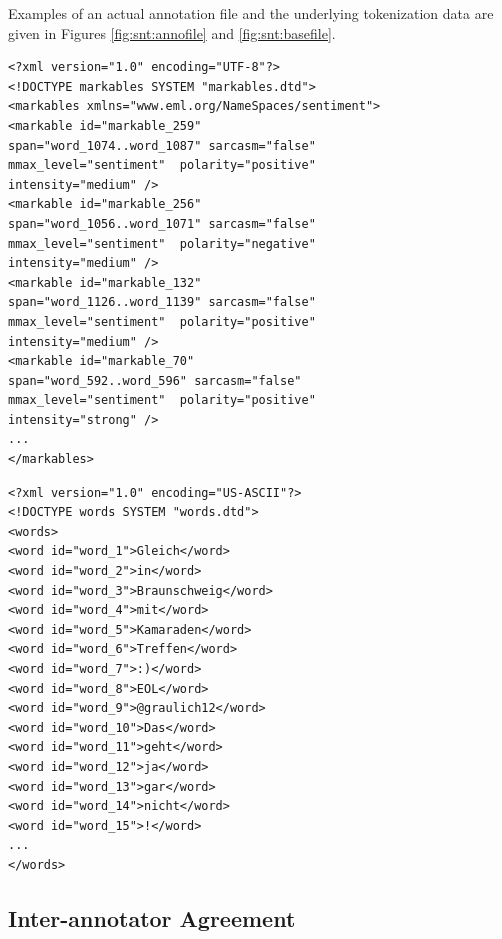 Examples of an actual annotation file and the underlying tokenization
data are given in Figures \ref{fig:snt:annofile} and
\ref{fig:snt:basefile}.

\begin{minipage}[t]{\textwidth}
  \begin{minipage}[t]{0.45\textwidth}
    \lstset{language=XML}
    \begin{lstlisting}
<?xml version="1.0" encoding="UTF-8"?>
<!DOCTYPE markables SYSTEM "markables.dtd">
<markables xmlns="www.eml.org/NameSpaces/sentiment">
<markable id="markable_259"
span="word_1074..word_1087" sarcasm="false"
mmax_level="sentiment"  polarity="positive"
intensity="medium" />
<markable id="markable_256"
span="word_1056..word_1071" sarcasm="false"
mmax_level="sentiment"  polarity="negative"
intensity="medium" />
<markable id="markable_132"
span="word_1126..word_1139" sarcasm="false"
mmax_level="sentiment"  polarity="positive"
intensity="medium" />
<markable id="markable_70"
span="word_592..word_596" sarcasm="false"
mmax_level="sentiment"  polarity="positive"
intensity="strong" />
...
</markables>
    \end{lstlisting}%
  \end{minipage}\hfill%
  \begin{minipage}[t]{0.45\textwidth}%
    \lstset{language=XML}
    \begin{lstlisting}[basicstyle=\tiny]
<?xml version="1.0" encoding="US-ASCII"?>
<!DOCTYPE words SYSTEM "words.dtd">
<words>
<word id="word_1">Gleich</word>
<word id="word_2">in</word>
<word id="word_3">Braunschweig</word>
<word id="word_4">mit</word>
<word id="word_5">Kamaraden</word>
<word id="word_6">Treffen</word>
<word id="word_7">:)</word>
<word id="word_8">EOL</word>
<word id="word_9">@graulich12</word>
<word id="word_10">Das</word>
<word id="word_11">geht</word>
<word id="word_12">ja</word>
<word id="word_13">gar</word>
<word id="word_14">nicht</word>
<word id="word_15">!</word>
...
</words>
    \end{lstlisting}%
  \end{minipage}
\end{minipage}

\subsection{Inter-annotator Agreement}\label{subsec:snt:iaa}

